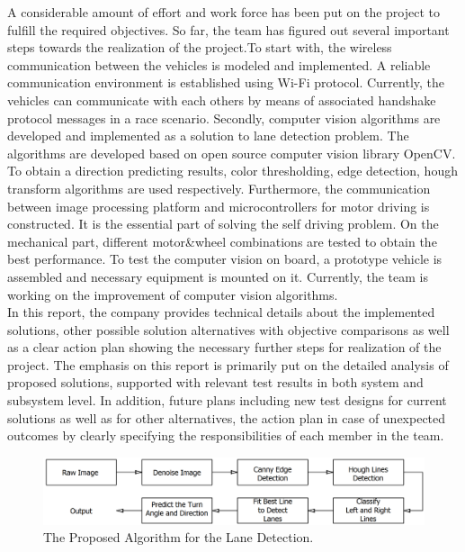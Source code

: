\documentclass[a4paper,12pt]{article}
\begin{document}
	A considerable amount of effort and work force has been put on the project to fulfill the required objectives. So far, the team has figured out several important steps towards the realization of the project.To start with, the wireless communication between the vehicles is modeled and implemented. A reliable communication environment is established using Wi-Fi protocol. Currently, the vehicles can communicate with each others by means of associated handshake protocol messages in a race scenario. Secondly, computer vision algorithms are developed and implemented as a solution to lane detection problem. The algorithms are developed based on open source computer vision library OpenCV. To obtain a direction predicting results, color thresholding, edge detection, hough transform algorithms are used respectively. Furthermore, the communication between image processing platform and microcontrollers for motor driving is constructed. It is the essential part of solving the self driving problem. On the mechanical part, different motor\&wheel combinations are tested to obtain the best performance. To test the computer vision on board, a prototype vehicle is assembled and necessary equipment is mounted on it. Currently, the team is working on the improvement of computer vision algorithms.\\
	
	In this report, the company provides technical details about the implemented solutions, other possible solution alternatives with objective comparisons as well as a clear action plan showing the necessary further steps for realization of the project. The emphasis on this report is primarily put on the detailed analysis of proposed solutions, supported with relevant test results in both system and subsystem level. In addition, future plans including new test designs for current solutions as well as for other alternatives, the action plan in case of unexpected outcomes by clearly specifying the responsibilities of each member in the team. \\
	


\begin{figure}[H]
\center
\setlength{\unitlength}{\textwidth} 
\includegraphics[width=\textwidth]{v-models/lane_detection_subsystem}
\caption{\label{fig:lane_detection_subsystem}The Proposed Algorithm for the Lane Detection.}
\end{figure}
\end{document}
